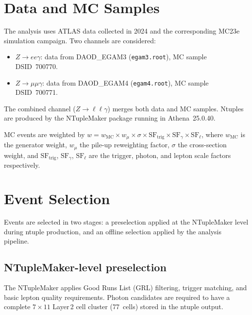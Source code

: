 \documentclass[11pt,a4paper]{article}
\begin{document}
\section{Data and MC Samples}
\label{sec:samples}

The analysis uses ATLAS data collected in 2024 and the corresponding
MC23e simulation campaign.  Two channels are considered:
\begin{itemize}
  \item $Z \to ee\gamma$: data from DAOD\_EGAM3 (\texttt{egam3.root}),
        MC sample DSID~700770.
  \item $Z \to \mu\mu\gamma$: data from DAOD\_EGAM4 (\texttt{egam4.root}),
        MC sample DSID~700771.
\end{itemize}
The combined channel ($Z \to \ell\ell\gamma$) merges both data and MC
samples.  Ntuples are produced by the NTupleMaker package running in
Athena~25.0.40.

MC events are weighted by
$w = w_{\text{MC}} \times w_\mu \times \sigma \times \text{SF}_{\text{trig}} \times \text{SF}_{\gamma} \times \text{SF}_{\ell}$,
where $w_{\text{MC}}$ is the generator weight, $w_\mu$ the pile-up
reweighting factor, $\sigma$ the cross-section weight, and
$\text{SF}_{\text{trig}}$, $\text{SF}_{\gamma}$, $\text{SF}_{\ell}$
are the trigger, photon, and lepton scale factors respectively.



\section{Event Selection}
\label{sec:selection}

Events are selected in two stages: a preselection applied at the
NTupleMaker level during ntuple production, and an offline selection
applied by the analysis pipeline.

\subsection{NTupleMaker-level preselection}
\label{sec:preselection}

The NTupleMaker applies Good Runs List (GRL) filtering, trigger
matching, and basic lepton quality requirements.  Photon candidates are
required to have a complete $7 \times 11$ Layer\,2 cell cluster
(77~cells) stored in the ntuple output.
\end{document}
